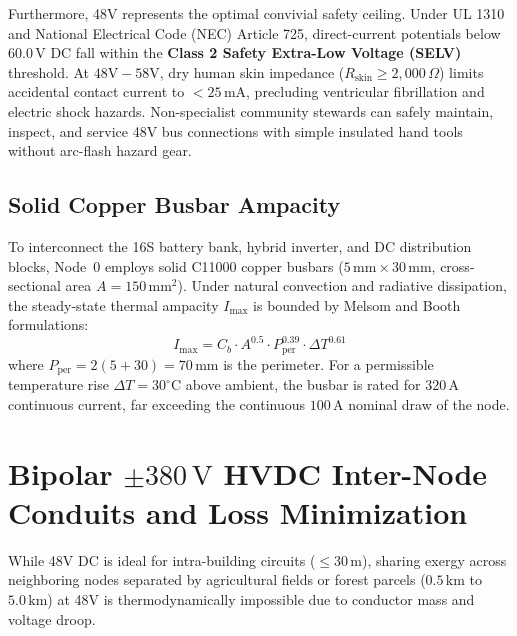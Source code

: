 Furthermore, 48V represents the optimal convivial safety ceiling. Under UL 1310 and National Electrical Code (NEC) Article 725, direct-current potentials below $60.0\,\mathrm{V}$ DC fall within the \textbf{Class 2 Safety Extra-Low Voltage (SELV)} threshold. At $48\mathrm{V}-58\mathrm{V}$, dry human skin impedance ($R_{\mathrm{skin}} \ge 2,000\,\Omega$) limits accidental contact current to $<25\,\mathrm{mA}$, precluding ventricular fibrillation and electric shock hazards. Non-specialist community stewards can safely maintain, inspect, and service 48V bus connections with simple insulated hand tools without arc-flash hazard gear.

\subsection{Solid Copper Busbar Ampacity}
To interconnect the 16S battery bank, hybrid inverter, and DC distribution blocks, Node~0 employs solid C11000 copper busbars ($5\,\mathrm{mm} \times 30\,\mathrm{mm}$, cross-sectional area $A = 150\,\mathrm{mm^2}$). Under natural convection and radiative dissipation, the steady-state thermal ampacity $I_{\max}$ is bounded by Melsom and Booth formulations:
\begin{equation}
I_{\max} = C_b \cdot A^{0.5} \cdot P_{\mathrm{per}}^{0.39} \cdot \Delta T^{0.61}
\label{eq:busbar_ampacity}
\end{equation}
where $P_{\mathrm{per}} = 2(5 + 30) = 70\,\mathrm{mm}$ is the perimeter. For a permissible temperature rise $\Delta T = 30^\circ\mathrm{C}$ above ambient, the busbar is rated for $320\,\mathrm{A}$ continuous current, far exceeding the continuous $100\,\mathrm{A}$ nominal draw of the node.

\section{Bipolar \texorpdfstring{$\pm 380\,\mathrm{V}$}{+-380 V} HVDC Inter-Node Conduits and Loss Minimization}
\label{sec:em_hvdc}

While 48V DC is ideal for intra-building circuits ($\le 30\,\mathrm{m}$), sharing exergy across neighboring nodes separated by agricultural fields or forest parcels ($0.5\,\mathrm{km}$ to $5.0\,\mathrm{km}$) at 48V is thermodynamically impossible due to conductor mass and voltage droop.

